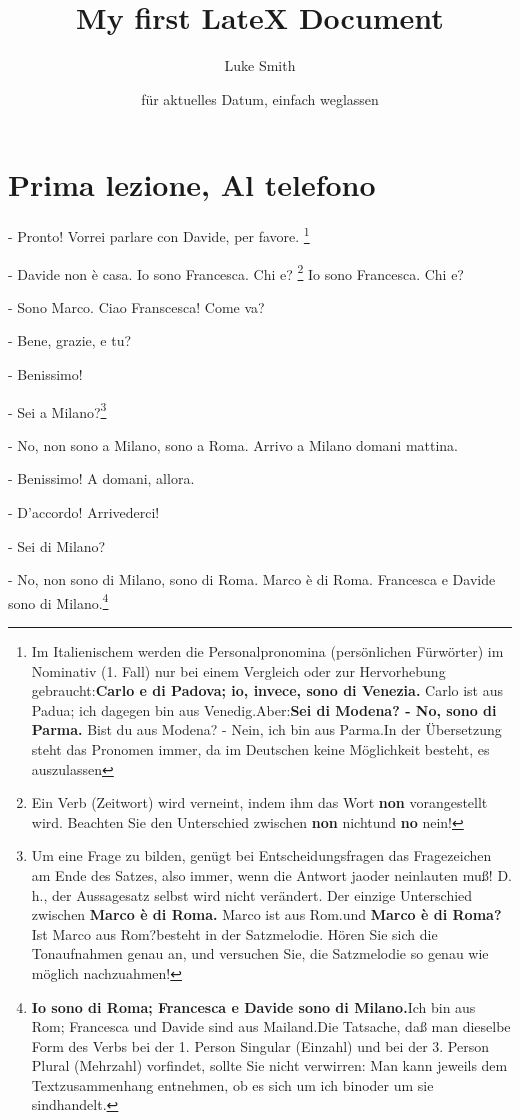 \documentclass{article}
\author{Luke Smith}
\title{My first LateX Document}
\date{für aktuelles Datum, einfach weglassen}
\begin{document}
\section{Prima lezione, Al telefono}
- Pronto!
Vorrei parlare con Davide, per favore. \footnote{Im Italienischem werden die Personalpronomina (persönlichen Fürwörter) im Nominativ (1. Fall) nur bei einem Vergleich oder zur Hervorhebung gebraucht:\textbf{Carlo e  di Padova; io, invece, sono di Venezia.} \glqq Carlo ist aus Padua; ich dagegen bin aus Venedig.\grqq Aber:\textbf{Sei di Modena? - No, sono di Parma.} \glqq Bist du aus Modena? - Nein, ich bin aus Parma.\grqq In der Übersetzung steht das Pronomen immer, da im Deutschen keine Möglichkeit besteht, es auszulassen} 

- Davide non è casa. Io sono Francesca. Chi e? \footnote{Ein Verb (Zeitwort) wird verneint, indem ihm das Wort \textbf{non} vorangestellt wird. Beachten Sie den Unterschied zwischen \textbf{non} \glqq nicht\grqq und \textbf{no} \glqq nein\grqq!} Io sono Francesca. Chi e?

- Sono Marco. Ciao Franscesca! Come va?

- Bene, grazie, e tu?

- Benissimo!

- Sei a Milano?\footnote{Um eine Frage zu bilden, genügt bei Entscheidungsfragen das Fragezeichen am Ende des Satzes, also immer, wenn die Antwort \glqq ja\grqq oder \glqq nein\grqq lauten muß! D. h., der Aussagesatz selbst wird nicht verändert. Der einzige Unterschied zwischen \textbf{Marco è di Roma.} \glqq Marco ist aus Rom.\grqq und \textbf{Marco è di Roma?} \glqq Ist Marco aus Rom?\grqq besteht in der Satzmelodie. Hören Sie sich die Tonaufnahmen genau an, und versuchen Sie, die Satzmelodie so genau wie möglich nachzuahmen!}

- No, non sono a Milano, sono a Roma. Arrivo a Milano domani mattina.

- Benissimo! A domani, allora.

- D'accordo! Arrivederci!

- Sei di Milano?

- No, non sono di Milano, sono di Roma. Marco è di Roma. Francesca e Davide sono di Milano.\footnote{\textbf{Io sono di Roma; Francesca e Davide sono di Milano.}\glqq Ich bin aus Rom; Francesca und Davide sind aus Mailand.\grqq Die Tatsache, daß man dieselbe Form des Verbs bei der 1. Person Singular (Einzahl) und bei der 3. Person Plural (Mehrzahl) vorfindet, sollte Sie nicht verwirren: Man kann jeweils dem Textzusammenhang entnehmen, ob es sich um \glqq ich bin\grqq oder um \glqq sie sind\grqq handelt.}
\end{document}
